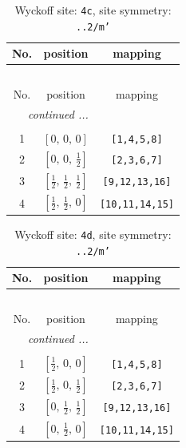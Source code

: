 \documentclass[fleqn,8pt]{jsarticle}
\begin{document}
\renewcommand{\arraystretch}{1.2}
\begin{longtable}{ccc}
\caption{Wyckoff site: {\tt 4c}, site symmetry: {\tt ..2/m'}}
 \\
 \hline \hline
No. & position & mapping \\ \hline \endfirsthead

\multicolumn{2}{l}{\tablename\ \thetable{}} \\
 \hline \hline
No. & position & mapping \\ \hline \endhead

 \hline \hline
\multicolumn{2}{r}{\footnotesize\it continued ...} \\ \endfoot

 \hline \hline
\multicolumn{2}{r}{} \\ \endlastfoot

1 & $\left[ 0,\, 0,\, 0 \right]$ & {\tt [1,4,5,8]} \\ \hline
2 & $\left[ 0,\, 0,\, \frac{1}{2} \right]$ & {\tt [2,3,6,7]} \\ \hline
3 & $\left[ \frac{1}{2},\, \frac{1}{2},\, \frac{1}{2} \right]$ & {\tt [9,12,13,16]} \\ \hline
4 & $\left[ \frac{1}{2},\, \frac{1}{2},\, 0 \right]$ & {\tt [10,11,14,15]} \\
\end{longtable}
\renewcommand{\arraystretch}{1.2}
\begin{longtable}{ccc}
\caption{Wyckoff site: {\tt 4d}, site symmetry: {\tt ..2/m'}}
 \\
 \hline \hline
No. & position & mapping \\ \hline \endfirsthead

\multicolumn{2}{l}{\tablename\ \thetable{}} \\
 \hline \hline
No. & position & mapping \\ \hline \endhead

 \hline \hline
\multicolumn{2}{r}{\footnotesize\it continued ...} \\ \endfoot

 \hline \hline
\multicolumn{2}{r}{} \\ \endlastfoot

1 & $\left[ \frac{1}{2},\, 0,\, 0 \right]$ & {\tt [1,4,5,8]} \\ \hline
2 & $\left[ \frac{1}{2},\, 0,\, \frac{1}{2} \right]$ & {\tt [2,3,6,7]} \\ \hline
3 & $\left[ 0,\, \frac{1}{2},\, \frac{1}{2} \right]$ & {\tt [9,12,13,16]} \\ \hline
4 & $\left[ 0,\, \frac{1}{2},\, 0 \right]$ & {\tt [10,11,14,15]} \\
\end{longtable}
\end{document}
